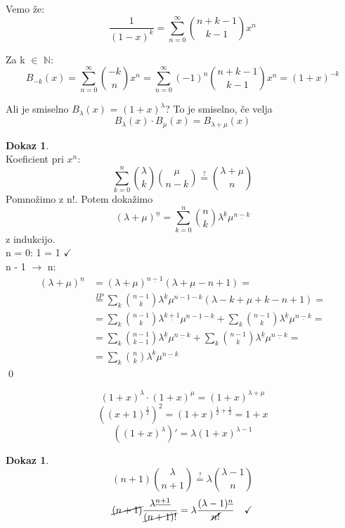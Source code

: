 \documentclass[a4paper,12pt]{article}
\theoremstyle{definition}
\newtheorem{pro}[counter]{Dokaz}
\theoremstyle{remark}
\newcommand{\N}{\mathbb{N}}
\begin{document}
Vemo že:
\[\frac{1}{(1 - x)^k} = \sum_{n = 0}^{\infty} \binom{n + k - 1}{k - 1} x^n\]

Za k $\in$ $\N$:
\[B_{-k} (x) = \sum_{n = 0}^{\infty} \binom{-k}{n} x^n = \sum_{n = 0}^{\infty} (-1)^n \binom{n + k - 1}{k - 1} x^n = (1 + x)^{-k}\]

Ali je smiselno $B_{\lambda} (x)$ = $(1 + x)^{\lambda}$? To je smiselno, če velja 
\[B_{\lambda} (x) \cdot B_{\mu} (x) = B_{\lambda + \mu} (x)\]

\begin{pro}\mbox{}\\
    Koeficient pri $x^n$:
    \[\sum_{k = 0}^n \binom{\lambda}{k} \binom{\mu}{n - k} \overset{?}{=} \binom{\lambda + \mu}{n}\]
    Pomnožimo z n!. Potem dokažimo
    \[(\lambda + \mu)^{\underline{n}} = \sum_{k = 0}^n \binom{n}{k} \lambda^{\underline{k}} \mu^{\underline{n - k}}\]
    z indukcijo.\\
    n = 0: 1 = 1 $\checkmark$\\
    n - 1 $\rightarrow$ n:
    \begin{align*}
        (\lambda + \mu)^{\underline{n}} & = (\lambda + \mu)^{\underline{n - 1}}(\lambda + \mu - n + 1) =\\
        & \overset{IP}{=} \sum_k \binom{n - 1}{k} \lambda^{\underline{k}} \mu^{\underline{n - 1 - k}} (\lambda - k + \mu + k - n + 1) = \\
        & = \sum_k \binom{n - 1}{k} \lambda^{\underline{k + 1}} \mu^{\underline{n - 1 - k}} + \sum_k \binom{n - 1}{k} \lambda^{\underline{k}} \mu^{\underline{n - k}} =\\
        & = \sum_k \binom{n - 1}{k - 1} \lambda^{\underline{k}} \mu^{\underline{n - k}} + \sum_k \binom{n - 1}{k} \lambda^{\underline{k}} \mu^{\underline{n - k}} = \\
        & = \sum_k \binom{n}{k} \lambda^{\underline{k}} \mu^{\underline{n - k}}
    \end{align*}
    \qed
\end{pro}

\[(1 + x)^{\lambda} \cdot (1 + x)^{\mu} = (1 + x)^{\lambda + \mu}\]
\[((x + 1)^{\frac{1}{2}})^2 = (1 + x)^{\frac{1}{2} + \frac{1}{2}} = 1 + x\]
\[((1 + x)^{\lambda})' = \lambda (1 + x)^{\lambda - 1}\]

\begin{pro}
    \[(n + 1) \binom{\lambda}{n + 1} \overset{?}{=} \lambda \binom{\lambda - 1}{n}\]
    \[\cancel{(n + 1)} \frac{\lambda^{\underline{n + 1}}}{\cancel{(n + 1)!}} = \lambda \frac{(\lambda - 1)^{\underline{n}}}{\cancel{n!}} \ \ \ \checkmark\]
\end{pro}
\end{document}

